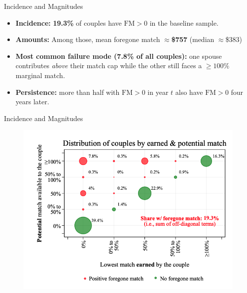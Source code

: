 \documentclass[11pt,notes=hide,aspectratio=169,mathserif]{beamer}
\begin{document}
\begin{frame}{Incidence and Magnitudes}
\small
\begin{itemize}
  \item \textbf{Incidence:} \textbf{19.3\%} of couples have $\mathrm{FM}>0$ in the baseline sample.
  \item \textbf{Amounts:} Among those, mean foregone match $\approx$\textbf{\$757} (median $\approx$\$383)
  \item \textbf{Most common failure mode (7.8\% of all couples):} one spouse contributes \emph{above} their match cap while the other still faces a $\ge100\%$ marginal match.
  \item \textbf{Persistence:} more than half with $\mathrm{FM}>0$ in year $t$ also have $\mathrm{FM}>0$ four years later.
\end{itemize}
\end{frame}

\begin{frame}{Incidence and Magnitudes}
\small
\begin{figure}
\centering
\includegraphics[width=0.9\linewidth]{inputs/figure2a.png}
\end{figure}
\end{frame}
\end{document}
